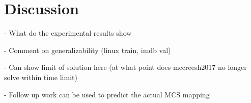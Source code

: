 \section{Discussion}
- What do the experimental results show

- Comment on generalizability (linux train, imdb val)

- Can show limit of solution here (at what point does mccreesh2017 no longer solve within time limit)

- Follow up work can be used to predict the actual MCS mapping